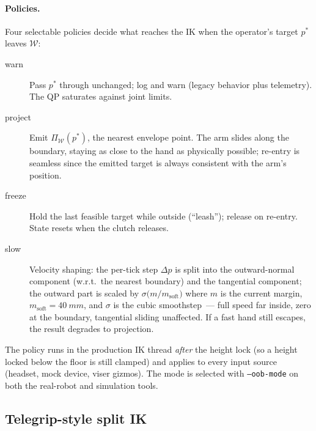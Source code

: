\paragraph{Policies.}
Four selectable policies decide what reaches the IK when the operator's
target \(p^\ast\) leaves \(\mathcal{W}\):
\begin{description}
  \item[warn] Pass \(p^\ast\) through unchanged; log and warn (legacy
    behavior plus telemetry). The QP saturates against joint limits.
  \item[project] Emit \(\Pi_{\mathcal{W}}(p^\ast)\), the nearest envelope
    point. The arm slides along the boundary, staying as close to the hand
    as physically possible; re-entry is seamless since the emitted target is
    always consistent with the arm's position.
  \item[freeze] Hold the last feasible target while outside (``leash'');
    release on re-entry. State resets when the clutch releases.
  \item[slow] Velocity shaping: the per-tick step \(\Delta p\) is split into
    the outward-normal component (w.r.t.\ the nearest boundary) and the
    tangential component; the outward part is scaled by
    \(\sigma\bigl(m/m_{\mathrm{soft}}\bigr)\) where \(m\) is the current
    margin, \(m_{\mathrm{soft}}=\SI{40}{mm}\), and \(\sigma\) is the cubic
    smoothstep~--- full speed far inside, zero at the boundary, tangential
    sliding unaffected. If a fast hand still escapes, the result degrades
    to projection.
\end{description}
The policy runs in the production IK thread \emph{after} the height lock
(so a height locked below the floor is still clamped) and applies to every
input source (headset, mock device, viser gizmos). The mode is selected
with \texttt{--oob-mode} on both the real-robot and simulation tools.

\subsection{Telegrip-style split IK}
\label{sec:telegrip}

